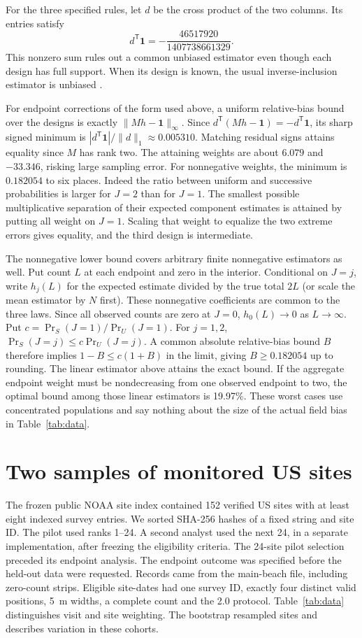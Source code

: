 \documentclass[10pt]{article}
\begin{document}
For the three specified rules, let $d$ be the cross product of the two columns. Its entries satisfy
\[ d^{\mathsf{T}}\mathbf{1}=-\frac{46517920}{1407738661329}. \]
This nonzero sum rules out a common unbiased estimator even though each design has full support. When its design is known, the usual inverse-inclusion estimator is unbiased \cite{ht}.

For endpoint corrections of the form used above, a uniform relative-bias bound over the designs is exactly $\|Mh-\mathbf1\|_\infty$. Since $d^\mathsf{T}(Mh-\mathbf1)=-d^\mathsf{T}\mathbf1$, its sharp signed minimum is $|d^\mathsf{T}\mathbf1|/\|d\|_1\approx0.005310$. Matching residual signs attains equality since $M$ has rank two. The attaining weights are about $6.079$ and $-33.346$, risking large sampling error. For nonnegative weights, the minimum is $0.182054$ to six places. Indeed the ratio between uniform and successive probabilities is larger for $J=2$ than for $J=1$. The smallest possible multiplicative separation of their expected component estimates is attained by putting all weight on $J=1$. Scaling that weight to equalize the two extreme errors gives equality, and the third design is intermediate.

The nonnegative lower bound covers arbitrary finite nonnegative estimators as well. Put count $L$ at each endpoint and zero in the interior. Conditional on $J=j$, write $h_j(L)$ for the expected estimate divided by the true total $2L$ (or scale the mean estimator by $N$ first). These nonnegative coefficients are common to the three laws. Since all observed counts are zero at $J=0$, $h_0(L)\to0$ as $L\to\infty$. Put $c=\Pr_S(J=1)/\Pr_U(J=1)$. For $j=1,2$, $\Pr_S(J=j)\le c\Pr_U(J=j)$. A common absolute relative-bias bound $B$ therefore implies $1-B\le c(1+B)$ in the limit, giving $B\ge0.182054$ up to rounding. The linear estimator above attains the exact bound. If the aggregate endpoint weight must be nondecreasing from one observed endpoint to two, the optimal bound among those linear estimators is 19.97\%. These worst cases use concentrated populations and say nothing about the size of the actual field bias in Table~\ref{tab:data}.

\section{Two samples of monitored US sites}
The frozen public NOAA site index contained 152 verified US sites with at least eight indexed survey entries. We sorted SHA-256 hashes of a fixed string and site ID. The pilot used ranks 1--24. A second analyst used the next 24, in a separate implementation, after freezing the eligibility criteria. The 24-site pilot selection preceded its endpoint analysis. The endpoint outcome was specified before the held-out data were requested. Records came from the main-beach file, including zero-count strips. Eligible site-dates had one survey ID, exactly four distinct valid positions, 5~m widths, a complete count and the 2.0 protocol. Table~\ref{tab:data} distinguishes visit and site weighting. The bootstrap resampled sites and describes variation in these cohorts.
\end{document}
